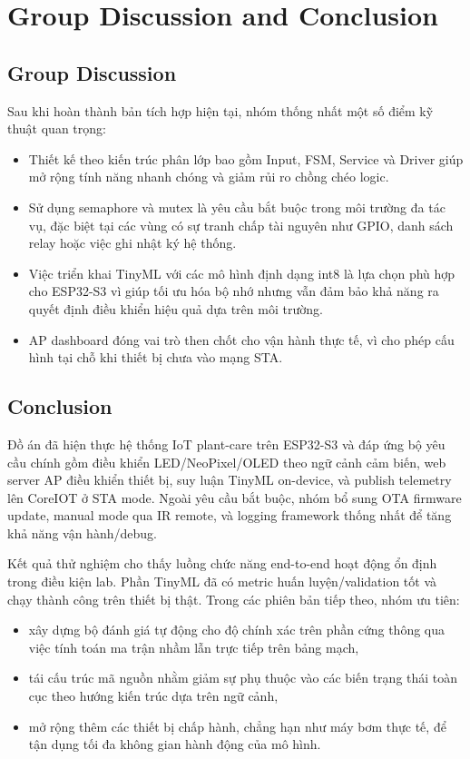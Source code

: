 \section{Group Discussion and Conclusion}

\subsection{Group Discussion}
Sau khi hoàn thành bản tích hợp hiện tại, nhóm thống nhất một số điểm kỹ thuật quan trọng:
\begin{itemize}
    \item Thiết kế theo kiến trúc phân lớp bao gồm Input, FSM, Service và Driver giúp mở rộng tính năng nhanh chóng và giảm rủi ro chồng chéo logic.
    \item Sử dụng semaphore và mutex là yêu cầu bắt buộc trong môi trường đa tác vụ, đặc biệt tại các vùng có sự tranh chấp tài nguyên như GPIO, danh sách relay hoặc việc ghi nhật ký hệ thống.
    \item Việc triển khai TinyML với các mô hình định dạng int8 là lựa chọn phù hợp cho ESP32-S3 vì giúp tối ưu hóa bộ nhớ nhưng vẫn đảm bảo khả năng ra quyết định điều khiển hiệu quả dựa trên môi trường.
    \item AP dashboard đóng vai trò then chốt cho vận hành thực tế, vì cho phép cấu hình tại chỗ khi thiết bị chưa vào mạng STA.
\end{itemize}

\subsection{Conclusion}
Đồ án đã hiện thực hệ thống IoT plant-care trên ESP32-S3 và đáp ứng bộ yêu cầu chính gồm điều khiển LED/NeoPixel/OLED theo ngữ cảnh cảm biến, web server AP điều khiển thiết bị, suy luận TinyML on-device, và publish telemetry lên CoreIOT ở STA mode. Ngoài yêu cầu bắt buộc, nhóm bổ sung OTA firmware update, manual mode qua IR remote, và logging framework thống nhất để tăng khả năng vận hành/debug.

Kết quả thử nghiệm cho thấy luồng chức năng end-to-end hoạt động ổn định trong điều kiện lab. Phần TinyML đã có metric huấn luyện/validation tốt và chạy thành công trên thiết bị thật. Trong các phiên bản tiếp theo, nhóm ưu tiên:
\begin{itemize}
    \item xây dựng bộ đánh giá tự động cho độ chính xác trên phần cứng thông qua việc tính toán ma trận nhầm lẫn trực tiếp trên bảng mạch,
    \item tái cấu trúc mã nguồn nhằm giảm sự phụ thuộc vào các biến trạng thái toàn cục theo hướng kiến trúc dựa trên ngữ cảnh,
    \item mở rộng thêm các thiết bị chấp hành, chẳng hạn như máy bơm thực tế, để tận dụng tối đa không gian hành động của mô hình.
\end{itemize}
